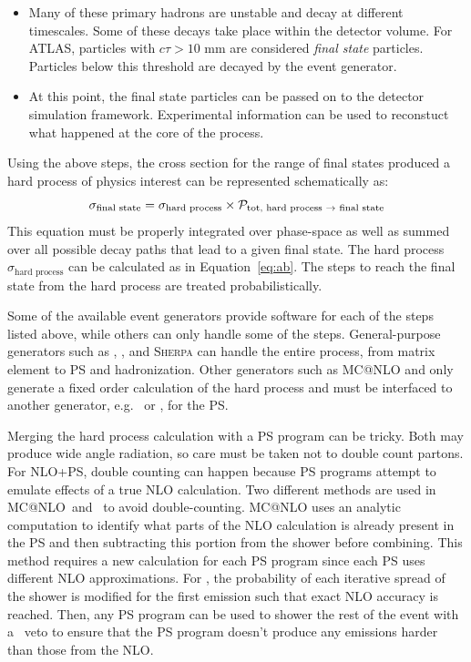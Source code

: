 \begin{itemize}
\item Many of these primary hadrons are unstable and decay at different timescales. Some of these decays take place within the detector volume. For ATLAS, particles with $c\tau > 10$ mm are considered \emph{final state} particles. Particles below this threshold are decayed by the event generator. 
\item At this point, the final state particles can be passed on to the detector simulation framework. Experimental information can be used to reconstuct what happened at the core of the process.
\end{itemize}

Using the above steps, the cross section for the range of final states produced a hard process of physics interest can be represented schematically as:
\begin{equation}
\sigma_{\text{final state}}=\sigma_{\text{hard process}} \times \mathcal{P}_{\text{tot, hard process \rarrow final state}}
\label{eq:finalst}
\end{equation}
This equation must be properly integrated over phase-space as well as summed over all possible decay paths that lead to a given final state. The hard process $\sigma_{\text{hard process}}$ can be calculated as in Equation~\ref{eq:ab}. The steps to reach the final state from the hard process are treated probabilistically.


Some of the available event generators provide software for each of the steps listed above, while others can only handle some of the steps. General-purpose generators such as \py, \hw, and \textsc{Sherpa} can handle the entire process, from matrix element to PS and hadronization. Other generators such as \textsc{MC@NLO}\cite{mcatnlo,mcatnlo2} and \pow \cite{Powheg,Powheg2,Powheg3,Powheg4} only generate a fixed order calculation of the hard process and must be interfaced to another generator, e.g. \py\ or \hw, for the PS. 

Merging the hard process calculation with a PS program can be tricky. Both may produce wide angle radiation, so care must be taken not to double count partons. For NLO+PS, double counting can happen because PS programs attempt to emulate effects of a true NLO calculation. Two different methods are used in \textsc{MC@NLO}\ and \pow\ to avoid double-counting. \textsc{MC@NLO}\cite{mcatnlo} uses an analytic computation to identify what parts of the NLO calculation is already present in the PS and then subtracting this portion from the shower before combining. This method requires a new calculation for each PS program since each PS uses different NLO approximations. For \pow\cite{Powheg,Powheg2}, the probability of each iterative spread of the shower is modified for the first emission such that exact NLO accuracy is reached. Then, any PS program can be used to shower the rest of the event with a \pt\ veto to ensure that the PS program doesn't produce any emissions harder than those from the NLO.

